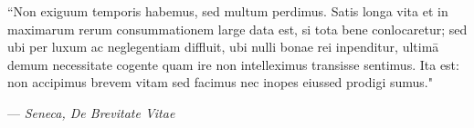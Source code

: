 \vspace*{\fill}
\begin{changemargin}{0.8in}{0.8in}
	\Large
	\begin{center}
		\thispagestyle{empty}
		\addtolength{\textwidth}{-10.75in}
		``Non exiguum temporis habemus, sed multum perdimus. Satis longa vita et in maximarum rerum consummationem large data est, si tota bene conlocaretur; sed ubi per luxum ac neglegentiam diffluit, ubi nulli bonae rei inpenditur, ultimā demum necessitate cogente quam ire non intelleximus transisse sentimus. Ita est: non accipimus brevem vitam sed facimus nec inopes eiussed prodigi sumus."
		\begin{flushright}
			--- \textit{Seneca, De Brevitate Vitae}
		\end{flushright}
	\end{center}
\end{changemargin}
\vspace*{\fill}